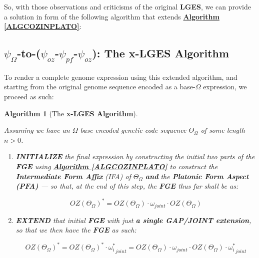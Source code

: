 \documentclass[a4paper, 18pt]{book} %
\newtheorem{alg}{Algorithm}
\begin{document}
So, with those observations and criticisms of the original \textbf{LGES}, we can provide a solution in form of the following algorithm that extends \textbf{\hyperref[ALGCOZINPLATO]{Algorithm \ref{ALGCOZINPLATO}}}:


\subsection{$\psi_{\Omega}$-to-($\psi_{oz}$-$\psi_{pf}$-$\psi_{oz}$): The x-LGES Algorithm}
\label{SECGENSEQEXPRESEXT}


To render a complete genome expression using this extended algorithm, and starting from the original genome sequence encoded as a base-$\Omega$ expression, we proceed as such: 

\begin{alg}[The \textbf{x-LGES Algorithm}]
\label{ALGCOZINPLATOEXT}

Assuming we have an $\Omega$-base encoded genetic code sequence $\Theta_\Omega$ of some length $n > 0$.

\begin{enumerate}
\item{\textbf{INITIALIZE} the final expression by constructing the initial two parts of the \textbf{FGE} using \textbf{\hyperref[ALGCOZINPLATO]{Algorithm \ref{ALGCOZINPLATO}}} to construct the \textbf{Intermediate Form Affix} (IFA) of $\Theta_\Omega$ \textbf{and} the \textbf{Platonic Form Aspect (PFA)} --- so that, at the end of this step, the \textbf{FGE} thus far shall be as:

\vspace{1em}
\begin{equation}
\label{EQTRANSLGENSEQEXT}
\boxed{OZ(\Theta_\Omega)}^* =   OZ(\Theta_\Omega) \cdot \boxed{\omega}_{joint} \cdot \boxed{OZ(\Theta_\Omega)}
\end{equation}
\vspace{1em}

}
\item {
\textbf{EXTEND} that initial \textbf{FGE} with just \textbf{a single GAP/JOINT extension}, so that we then have the \textbf{FGE} as such:

\vspace{1em}
		\begin{equation}
		\label{EQEXTFGEJOINTEXT}
		\boxed{OZ(\Theta_\Omega)}^* = \boxed{OZ(\Theta_\Omega)}^* \cdot \boxed{\omega_i^*}_{joint} = OZ(\Theta_\Omega) \cdot \boxed{\omega}_{joint} \cdot \boxed{OZ(\Theta_\Omega)} \cdot \boxed{\omega_i^*}_{joint}
		\end{equation}	
		\vspace{1em}				

}
\end{enumerate}
\end{alg}
\end{document}
